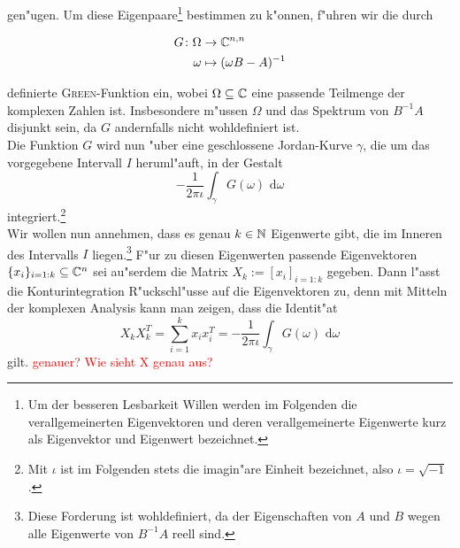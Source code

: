 gen"ugen. Um diese Eigenpaare\footnote{Um der besseren Lesbarkeit Willen werden
im Folgenden die verallgemeinerten Eigenvektoren und deren verallgemeinerte
Eigenwerte kurz als Eigenvektor und Eigenwert bezeichnet.}
bestimmen zu k"onnen, f"uhren wir die durch%



  \begin{align*}
  G\colon\Omega &\to\mathbb{C}^{n,n}\\
  \omega &\mapsto (\omega B - A)^{-1}
  \end{align*}

definierte \textsc{Green}-Funktion ein, wobei $\Omega \subseteq \mathbb{C}$ eine passende
Teilmenge der komplexen Zahlen ist. Insbesondere m"ussen $\Omega$ und das
Spektrum von $B^{-1}A$ disjunkt sein, da $G$ andernfalls nicht wohldefiniert ist.\\

Die Funktion $G$ wird nun "uber eine geschlossene Jordan-Kurve $\gamma$,
die um das vorgegebene Intervall $I$ heruml"auft, in der Gestalt
\[
-\frac{1}{2\pi\iota}\int_\gamma G(\omega)\text{ d}\omega
\]
integriert.\footnote{Mit $\iota$ ist im Folgenden stets die imagin"are Einheit bezeichnet,
also $\iota = \sqrt{-1}$.}\\

Wir wollen nun annehmen, dass es genau $k\in\mathbb{N}$ Eigenwerte gibt,
die im Inneren des Intervalls $I$ liegen.\footnote{Diese Forderung ist wohldefiniert, da
der Eigenschaften von $A$ und $B$ wegen alle Eigenwerte von $B^{-1}A$ reell sind.}
F"ur zu diesen Eigenwerten passende Eigenvektoren $\{x_i\}_{i=1:k} \subseteq \mathbb{C}^n$ sei au"serdem die Matrix
$X_k := [x_i]_{i=1:k}$ gegeben.
Dann l"asst die Konturintegration R"uckschl"usse auf die Eigenvektoren zu, denn mit
Mitteln der komplexen Analysis kann man
zeigen, dass die Identit"at
\begin{equation}\label{eq:integral}
X_k X_k^T = \sum_{i=1}^k x_i x_i^T =
-\frac{1}{2\pi\iota}\int_\gamma G(\omega)\text{ d}\omega
\end{equation}
gilt. \textcolor{red}{genauer? Wie sieht X genau aus?}\\


